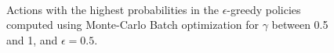 \documentclass[11pt]{article}   	%
\begin{document}
\begin{figure}[ht!]
     \begin{center}
%
        \\ %
    \end{center}
    \caption{%
        Actions with the highest probabilities in the $\epsilon$-greedy policies computed using Monte-Carlo Batch optimization for $\gamma$ between 0.5 and 1, and $\epsilon=0.5$. 
     }%
   \label{fig:gammacomp}
\end{figure}
\end{document}
